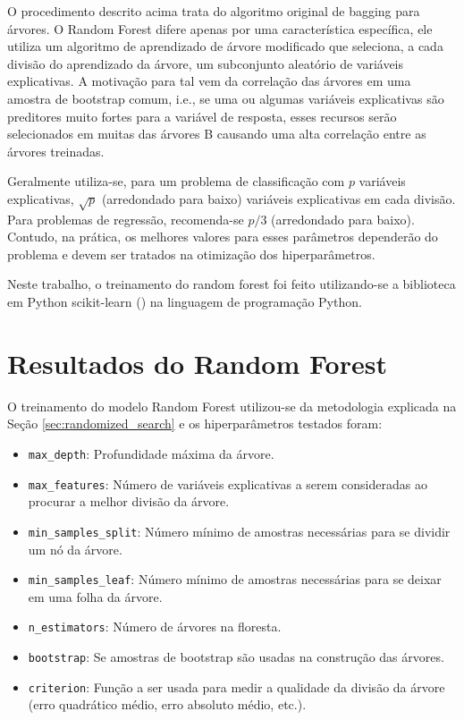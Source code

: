 O procedimento descrito acima trata do algoritmo original de bagging para árvores. O Random Forest difere apenas por uma característica específica, ele utiliza um algoritmo de aprendizado de árvore modificado que seleciona, a cada divisão do aprendizado da árvore, um subconjunto aleatório de variáveis explicativas. A motivação para tal vem da correlação das árvores em uma amostra de bootstrap comum, i.e., se uma ou algumas variáveis explicativas são preditores muito fortes para a variável de resposta, esses recursos serão selecionados em muitas das árvores B causando uma alta correlação entre as árvores treinadas.

Geralmente utiliza-se, para um problema de classificação com $ p $ variáveis explicativas, $ \sqrt{p} $ (arredondado para baixo) variáveis explicativas ​​em cada divisão. Para problemas de regressão, recomenda-se $ p/3 $ (arredondado para baixo). Contudo, na prática, os melhores valores para esses parâmetros dependerão do problema e devem ser tratados na otimização dos hiperparâmetros.

Neste trabalho, o treinamento do random forest foi feito utilizando-se a biblioteca em Python scikit-learn (\citet{Sklearn}) na linguagem de programação Python.

\section{Resultados do Random Forest}
\label{sec:resultados_random_forest}

O treinamento do modelo Random Forest utilizou-se da metodologia explicada na Seção \ref{sec:randomized_search} e os hiperparâmetros testados foram:

\begin{itemize}
	\item \verb|max_depth|: Profundidade máxima da árvore.
	\item \verb|max_features|: Número de variáveis explicativas a serem consideradas ao procurar a melhor divisão da árvore.
	\item \verb|min_samples_split|: Número mínimo de amostras necessárias para se dividir um nó da árvore.
	\item \verb|min_samples_leaf|: Número mínimo de amostras necessárias para se deixar em uma folha da árvore.
	\item \verb|n_estimators|: Número de árvores na floresta.
	\item \verb|bootstrap|: Se amostras de bootstrap são usadas na construção das árvores.
	\item \verb|criterion|: Função a ser usada para medir a qualidade da divisão da árvore (erro quadrático médio, erro absoluto médio, etc.).
\end{itemize}

